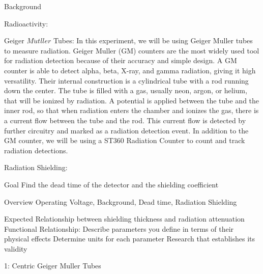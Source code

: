 Background

Radioactivity: 

Geiger $M\ddot{u}tller$ Tubes:
In this experiment, we will be using Geiger Muller tubes to measure radiation. Geiger Muller (GM) counters are the most widely used tool for radiation detection because of their accuracy and simple design. A GM counter is able to detect alpha, beta, X-ray, and gamma radiation, giving it high versatility\cite{whatever}. Their internal construction is a cylindrical tube with a rod running down the center. The tube is filled with a gas, usually neon, argon, or helium, that will be ionized by radiation. A potential is applied between the tube and the inner rod, so that when radiation enters the chamber and ionizes the gas, there is a current flow between the tube and the rod. This current flow is detected by further circuitry and marked as a radiation detection event. In addition to the GM counter, we will be using a ST360 Radiation Counter to count and track radiation detections.


Radiation Shielding:

Goal
Find the dead time of the detector and the shielding coefficient

Overview
Operating Voltage, Background, Dead time, Radiation Shielding


Expected Relationship between shielding thickness and radiation attenuation
Functional Relationship:
Describe parameters you define in terms of their physical effects
Determine units for each parameter
Research that establishes its validity

1: Centric Geiger Muller Tubes 